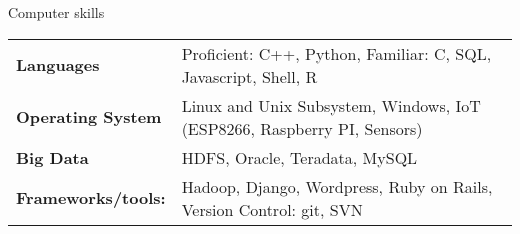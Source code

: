 \documentclass{resume} %
\begin{document}
\vspace{-1cm}
\begin{rSection}{Computer skills}
\vspace{-0.2cm}
\begin{multicols}{2}
    \noindent
        \begin{tabular}{ p{4.2cm} l}
        \bf{Languages} & Proficient: C++, Python, Familiar: C, SQL, Javascript, Shell, R \\
        \bf{Operating System} & Linux and Unix Subsystem, Windows, IoT (ESP8266, Raspberry PI, Sensors) \\ 
        \bf{Big Data} &  HDFS, Oracle, Teradata, MySQL \\
        \bf{Frameworks/tools:} & Hadoop, Django, Wordpress, Ruby on Rails, Version Control: git, SVN 
        \end{tabular}
    \end{multicols}
\end{rSection}
\end{document}
